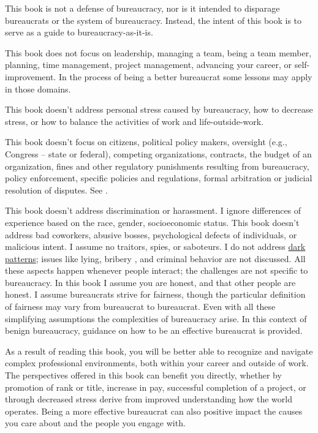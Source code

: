 This book is not a defense of bureaucracy, nor is it intended to disparage bureaucrats or the system of bureaucracy. Instead, the intent of this book is to serve as a guide to bureaucracy-as-it-is. 

This book does not focus on leadership, managing a team, being a team member, planning, time management, project management, advancing your career, or self-improvement. In the process of being a better bureaucrat some lessons may apply in those domains.

This book doesn't address personal stress caused by bureaucracy, how to decrease stress, or how to balance the activities of work and life-outside-work. 


This book doesn't focus on citizens, political policy makers, oversight (e.g., Congress -- state or federal), competing organizations, contracts, the budget of an organization, fines and other regulatory punishments resulting from bureaucracy, policy enforcement, specific policies and regulations, formal arbitration or judicial resolution of disputes. See \cite{1991_Wilson}.

This book doesn't address discrimination or harassment. I ignore differences of experience based on the race, gender, socioeconomic status. This book doesn't address bad coworkers, abusive bosses, psychological defects of individuals, or malicious intent. I assume no traitors, spies, or saboteurs. I do not address \href{https://en.wikipedia.org/wiki/Dark_pattern}{dark patterns}; issues like lying, bribery \cite{2021_Ang}, and criminal behavior are not discussed. All these aspects happen whenever people interact; the challenges are not specific to bureaucracy. In this book I assume you are honest, and that other people are honest.  
I assume bureaucrats strive for fairness, though the particular definition of fairness may vary from bureaucrat to bureaucrat. 
Even with all these simplifying assumptions the complexities of bureaucracy arise. In this context of benign bureaucracy, guidance on how to be an effective bureaucrat is provided.


As a result of reading this book, you will be better able to recognize and navigate complex professional environments, both within your career and outside of work. The perspectives offered in this book can benefit you directly, whether by promotion of rank or title, increase in pay, successful completion of a project, or through decreased stress derive from improved understanding how the world operates. Being a more effective bureaucrat can also positive impact the causes you care about and the people you engage with.

